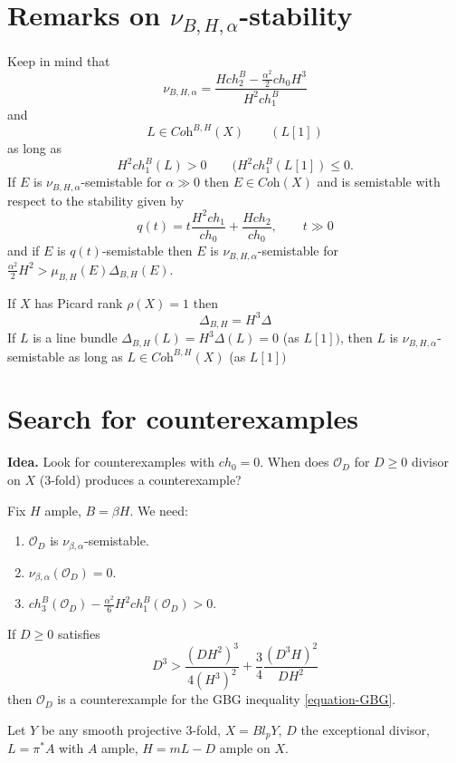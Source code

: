 \section{Remarks on
$\nu_{B,H,\alpha}$-stability}
\label{bsgt-label-004}
Keep in mind that
$$
\nu_{B,H,\alpha}=
\frac{Hch_2^B-\frac{\alpha^2}
{2}ch_0H^3}
{H^2 ch_1^B}
$$
and
$$
L \in \textit{Coh}^{B,H}(X) \qquad (L[1])
$$
as long as
$$
H^2ch_1^B(L)>0 \qquad (H^2ch_1^B(L[1])\leq 0.
$$
\medskip
If $E$ is $\nu_{B,H,\alpha}$-semistable for
$\alpha\gg 0$ then $E\in\textit{Coh}(X)$ and
is semistable with respect to the stability
given by
$$
q(t)=t \frac{H^2 ch_1}{ch_0}+ \frac{H
ch_2}{ch_0},\qquad t\gg 0
$$
and if $E$ is $q(t)$-semistable then $E$ is
$\nu_{B,H,\alpha}$-semistable for
$\frac{\alpha^2}{2}H^2>\mu_{B,H}(E)\Delta_{B,
H}(E)$.

If $X$ has Picard rank $\rho(X)=1$ then
$$
\Delta_{B,H}=H^3\Delta
$$
If $L$ is a line bundle
$\Delta_{B,H}(L)=H^3\Delta(L)=0$ (as $L[1])$,
then $L$ is $\nu_{B,H,\alpha}$-semistable as
long as $L \in \textit{Coh}^{B,H}(X)$ (as
$L[1])$

\section{Search for counterexamples}
\label{section-search-for-counterexamples}

{\bf Idea.} Look for counterexamples with
$ch_0=0$. When does $\mathcal{O}_D$ for
$D\geq 0$ divisor on $X$ (3-fold) produces a
counterexample?

Fix $H$ ample, $B=\beta H$. We need:
\begin{enumerate}
\item $\mathcal{O}_D$ is
$\nu_{\beta,\alpha}$-semistable.
\item $\nu_{\beta,\alpha}(\mathcal{O}_D)=0$.
\item
$ch_3^B(\mathcal{O}_D)-\frac{\alpha^2}{6}
H^2ch_1^B(\mathcal{O}_D)>0$.
\end{enumerate}

\begin{lemma}
\label{lemma-counterexample}
If $D \geq 0$ satisfies
$$
D^3>\frac{(DH^2)^3}{4(H^3)^2}+\frac{3}{4}
\frac{(D^3H)^2}{DH^2}
$$
then $\mathcal{O}_D$ is a counterexample for
the GBG inequality
\ref{equation-GBG}.
\end{lemma}

\begin{example}
\label{example-duplicate-2}
Let $Y$ be any smooth projective 3-fold,
$X=Bl_pY$, $D$ the exceptional divisor,
$L=\pi^*A$ with $A$ ample, $H=mL-D$ ample on
$X$.
\end{example}

